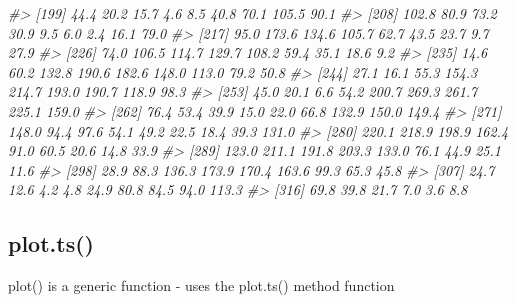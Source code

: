 \documentclass[
]{book}
\newenvironment{Shaded}{\begin{snugshade}}{\end{snugshade}}
\newcommand{\CommentTok}[1]{\textcolor[rgb]{0.56,0.35,0.01}{\textit{#1}}}
\newcommand{\FunctionTok}[1]{\textcolor[rgb]{0.00,0.00,0.00}{#1}}
\newcommand{\NormalTok}[1]{#1}
\newcommand{\SpecialCharTok}[1]{\textcolor[rgb]{0.00,0.00,0.00}{#1}}
\begin{document}
\begin{Shaded}
\begin{Highlighting}[]
\CommentTok{\#\textgreater{} [199]  44.4  20.2  15.7   4.6   8.5  40.8  70.1 105.5  90.1}
\CommentTok{\#\textgreater{} [208] 102.8  80.9  73.2  30.9   9.5   6.0   2.4  16.1  79.0}
\CommentTok{\#\textgreater{} [217]  95.0 173.6 134.6 105.7  62.7  43.5  23.7   9.7  27.9}
\CommentTok{\#\textgreater{} [226]  74.0 106.5 114.7 129.7 108.2  59.4  35.1  18.6   9.2}
\CommentTok{\#\textgreater{} [235]  14.6  60.2 132.8 190.6 182.6 148.0 113.0  79.2  50.8}
\CommentTok{\#\textgreater{} [244]  27.1  16.1  55.3 154.3 214.7 193.0 190.7 118.9  98.3}
\CommentTok{\#\textgreater{} [253]  45.0  20.1   6.6  54.2 200.7 269.3 261.7 225.1 159.0}
\CommentTok{\#\textgreater{} [262]  76.4  53.4  39.9  15.0  22.0  66.8 132.9 150.0 149.4}
\CommentTok{\#\textgreater{} [271] 148.0  94.4  97.6  54.1  49.2  22.5  18.4  39.3 131.0}
\CommentTok{\#\textgreater{} [280] 220.1 218.9 198.9 162.4  91.0  60.5  20.6  14.8  33.9}
\CommentTok{\#\textgreater{} [289] 123.0 211.1 191.8 203.3 133.0  76.1  44.9  25.1  11.6}
\CommentTok{\#\textgreater{} [298]  28.9  88.3 136.3 173.9 170.4 163.6  99.3  65.3  45.8}
\CommentTok{\#\textgreater{} [307]  24.7  12.6   4.2   4.8  24.9  80.8  84.5  94.0 113.3}
\CommentTok{\#\textgreater{} [316]  69.8  39.8  21.7   7.0   3.6   8.8}
\end{Highlighting}
\end{Shaded}

\begin{Shaded}
\end{Shaded}

\hypertarget{plot.ts}{%
\subsection{plot.ts()}\label{plot.ts}}

plot() is a generic function - uses the plot.ts() method function
\end{document}

